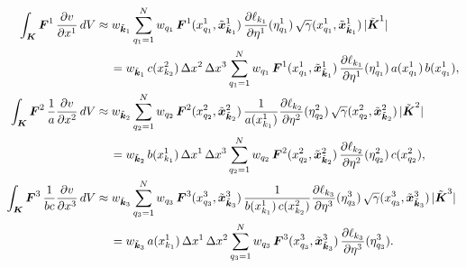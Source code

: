 \documentclass[10pt,preprint]{aastex}
\newcommand{\dx}{\Delta x}
\begin{document}
\begin{align}
  \int_{\bK}\bF^{1}\,\pderiv{v}{x^{1}}\,dV
  &\approx w_{\tilde{\bk}_{1}}\sum_{q_{1}=1}^{N}w_{q_{1}}\,\bF^{1}(x_{q_{1}}^{1},\tilde{\bx}_{\tilde{\bk}_{1}}^{1})\,
  \pderiv{\ell_{k_{1}}}{\eta^{1}}(\eta_{q_{1}}^{1})\,\sqrt{\gamma}(x_{q_{1}}^{1},\tilde{\bx}_{\tilde{\bk}_{1}}^{1})\,|\tilde{\bK}^{1}| \nonumber \\
  &\hspace{12pt}
  =w_{\tilde{\bk}_{1}}\,c(x_{k_{2}}^{2})\,\dx^{2}\,\dx^{3}
  \sum_{q_{1}=1}^{N}w_{q_{1}}\,\bF^{1}(x_{q_{1}}^{1},\tilde{\bx}_{\tilde{\bk}_{1}}^{1})\,
  \pderiv{\ell_{k_{1}}}{\eta^{1}}(\eta_{q_{1}}^{1})\,a(x_{q_{1}}^{1})\,b(x_{q_{1}}^{1}), \\
  \int_{\bK}\bF^{2}\,\f{1}{a}\pderiv{v}{x^{2}}\,dV
  &\approx w_{\tilde{\bk}_{2}}\sum_{q_{2}=1}^{N}w_{q_{2}}\,\bF^{2}(x_{q_{2}}^{2},\tilde{\bx}_{\tilde{\bk}_{2}}^{2})\,
  \f{1}{a(x_{k_{1}}^{1})}\pderiv{\ell_{k_{2}}}{\eta^{2}}(\eta_{q_{2}}^{2})\,\sqrt{\gamma}(x_{q_{2}}^{2},\tilde{\bx}_{\tilde{\bk}_{2}}^{2})\,|\tilde{\bK}^{2}| \\
  &\hspace{12pt}
  =w_{\tilde{\bk}_{2}}\,b(x_{k_{1}}^{1})\,\dx^{1}\,\dx^{3}\sum_{q_{2}=1}^{N}w_{q_{2}}\,\bF^{2}(x_{q_{2}}^{2},\tilde{\bx}_{\tilde{\bk}_{2}}^{2})\,
  \pderiv{\ell_{k_{2}}}{\eta^{2}}(\eta_{q_{2}}^{2})\,c(x_{q_{2}}^{2}), \\
  \int_{\bK}\bF^{3}\,\f{1}{bc}\pderiv{v}{x^{3}}\,dV
  &\approx w_{\tilde{\bk}_{3}}\sum_{q_{3}=1}^{N}w_{q_{3}}\,\bF^{3}(x_{q_{3}}^{3},\tilde{\bx}_{\tilde{\bk}_{3}}^{3})\,
  \f{1}{b(x_{k_{1}}^{1})\,c(x_{k_{2}}^{2})}\pderiv{\ell_{k_{3}}}{\eta^{3}}(\eta_{q_{3}}^{3})\,\sqrt{\gamma}(x_{q_{3}}^{3},\tilde{\bx}_{\tilde{\bk}_{3}}^{3})\,|\tilde{\bK}^{3}| \nonumber \\
  &\hspace{12pt}
  =w_{\tilde{\bk}_{3}}\,a(x_{k_{1}}^{1})\,\dx^{1}\,\dx^{2}\sum_{q_{3}=1}^{N}w_{q_{3}}\,\bF^{3}(x_{q_{3}}^{3},\tilde{\bx}_{\tilde{\bk}_{3}}^{3})\,
  \pderiv{\ell_{k_{3}}}{\eta^{3}}(\eta_{q_{3}}^{3}).  
\end{align}
\end{document}
